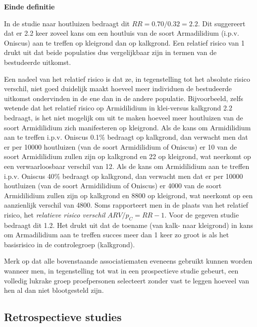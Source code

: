 \documentclass[
  12pt,dutch]{book}
\theoremstyle{definition}
\theoremstyle{definition}
\theoremstyle{definition}
\theoremstyle{definition}
\theoremstyle{remark}
\begin{document}
\textbf{Einde definitie}

In de studie naar houtluizen bedraagt dit \(RR=0.70/0.32=2.2\). Dit
suggereert dat er 2.2 keer zoveel kans om een houtluis van de soort Armadilidium (i.p.v. Oniscus) aan te treffen op kleigrond dan op kalkgrond. Een
relatief risico van 1 drukt uit dat beide populaties dus vergelijkbaar zijn in termen van de bestudeerde uitkomst.

Een nadeel van het relatief risico is dat ze, in tegenstelling tot het absolute risico verschil, niet goed duidelijk maakt hoeveel meer individuen de bestudeerde uitkomst ondervinden in de ene dan in de andere populatie. Bijvoorbeeld, zelfs wetende dat het relatief risico op Armidilidium in klei-versus kalkgrond 2.2 bedraagt, is het niet mogelijk om uit te maken hoeveel meer houtluizen van de soort Armidilidium zich manifesteren op kleigrond. Als de kans om Armidilidium aan te treffen i.p.v. Oniscus 0.1\% bedraagt op kalkgrond, dan verwacht men dat er per 10000 houtluizen (van de soort Armidilidium of Oniscus) er 10 van de soort Armidilidium zullen zijn op kalkgrond en 22 op kleigrond, wat neerkomt op een verwaarloosbaar verschil van 12. Als de kans om Armidilidium aan te treffen i.p.v. Oniscus 40\% bedraagt op kalkgrond, dan verwacht men dat er per 10000 houtluizen (van de soort Armidilidium of Oniscus) er 4000 van de soort Armidilidium zullen zijn op kalkgrond en 8800 op kleigrond, wat neerkomt op een aanzienlijk verschil van 4800. Soms rapporteert men in de plaats van het relatief risico, het
\emph{relatieve risico verschil} \(ARV/p_C=RR-1\). Voor de gegeven studie
bedraagt dit 1.2. Het drukt uit dat de toename (van kalk- naar kleigrond) in kans om Armadilidium aan te treffen succes meer dan 1 keer zo groot is als het basisrisico in de controlegroep (kalkgrond).

Merk op dat alle bovenstaande associatiematen eveneens gebruikt kunnen
worden wanneer men, in tegenstelling tot wat in een prospectieve studie
gebeurt, een volledig lukrake groep proefpersonen selecteert zonder vast te
leggen hoeveel van hen al dan niet blootgesteld zijn.

\subsection{Retrospectieve studies}\label{subsec:retrospect}
\end{document}
